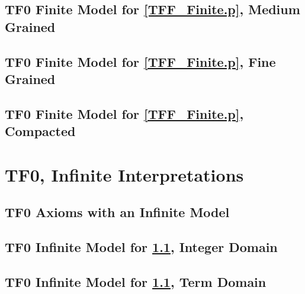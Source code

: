\documentclass{easychair}
\begin{document}
\newpage
\subsection{TF0 Finite Model for \ref{TFF_Finite.p}, Medium Grained}
\label{TFF_Finite_Medium.s}
\begin{small}

\end{small}

\newpage
\subsection{TF0 Finite Model for \ref{TFF_Finite.p}, Fine Grained}
\label{TFF_Finite_Fine.s}
\begin{small}

\end{small}

\newpage
\subsection{TF0 Finite Model for \ref{TFF_Finite.p}, Compacted}
\label{TFF_Finite_Compact.s}
\begin{small}

\end{small}

\newpage
\section{TF0, Infinite Interpretations}
\label{TF0Infinite}

\subsection{TF0 Axioms with an Infinite Model}
\label{TFF_Infinite.p}
\begin{small}

\end{small}

\newpage
\subsection{TF0 Infinite Model for \ref{TFF_Infinite.p}, Integer Domain}
\label{TFF_Integer.s}
\begin{small}

\end{small}

\newpage
\subsection{TF0 Infinite Model for \ref{TFF_Infinite.p}, Term Domain}
\label{TFF_Peano.s}
\begin{small}

\end{small}
\end{document}
